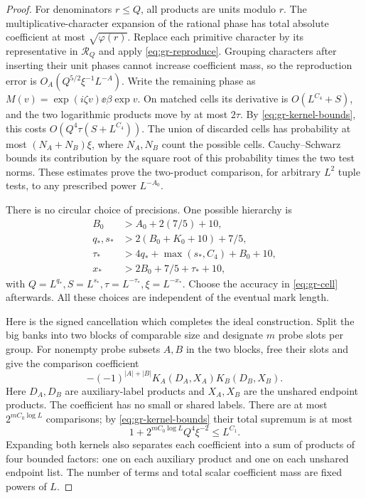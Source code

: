 \begin{proof}
For denominators \(r\le Q\), all products are units modulo \(r\).
The multiplicative-character expansion of the rational phase has
total absolute coefficient at most \(\sqrt{\varphi(r)}\).
Replace each primitive character by its representative in
\(\mathcal R_Q\) and apply \eqref{eq:gr-reproduce}.
Grouping characters after inserting their unit phases cannot increase
coefficient mass, so the reproduction error is
\(O_A(Q^{5/2}\xi^{-1}L^{-A})\).
Write the remaining phase as
\(M(v)=\exp(i\zeta v)\ee{\beta\exp v}\).
On matched cells its derivative is
\(O(L^{C_4}+S)\), and the two logarithmic products move by at most
\(2\tau\).  By \eqref{eq:gr-kernel-bounds}, this costs
\(O(Q^4\tau(S+L^{C_4}))\).
The union of discarded cells has probability at most
\((N_A+N_B)\xi\), where \(N_A,N_B\) count the possible cells.
Cauchy--Schwarz bounds its contribution by the square root of this
probability times the two test norms.
These estimates prove the two-product comparison, for arbitrary
\(L^2\) tuple tests, to any prescribed power \(L^{-A_0}\).

There is no circular choice of precisions.  One possible hierarchy is
\[
 \begin{split}
 B_0&>A_0+2(7/5)+10,\\
 q_*,s_*&>2(B_0+K_0+10)+7/5,\\
 \tau_*&>4q_*+\max(s_*,C_4)+B_0+10,\\
 x_*&>2B_0+7/5+\tau_*+10,
 \end{split}
\]
with \(Q=L^{q_*},S=L^{s_*},\tau=L^{-\tau_*},\xi=L^{-x_*}\).
Choose the accuracy in \eqref{eq:gr-cell} afterwards.
All these choices are independent of the eventual mark length.

Here is the signed cancellation which completes the ideal construction.
Split the big banks into two blocks of comparable size and designate
\(m\) probe slots per group.  For nonempty probe subsets
\(A,B\) in the two blocks, free their slots and give the comparison
coefficient
\begin{equation}
              -(-1)^{|A|+|B|}K_A(D_A,X_A)K_B(D_B,X_B).
 \label{eq:gr-signed}
\end{equation}
Here \(D_A,D_B\) are auxiliary-label products and \(X_A,X_B\)
are the unshared endpoint products.  The coefficient has no small
or shared labels.  There are at most \(2^{mC_0\log L}\) comparisons;
by \eqref{eq:gr-kernel-bounds} their total supremum is at most
\begin{equation}
        1+2^{mC_0\log L}Q^4\xi^{-2}\le L^{C_1}.         \label{eq:gr-coeffcost}
\end{equation}
Expanding both kernels also separates each coefficient into a sum
of products of four bounded factors: one on each auxiliary product
and one on each unshared endpoint list.  The number of terms and
total scalar coefficient mass are fixed powers of \(L\).


\end{proof}
